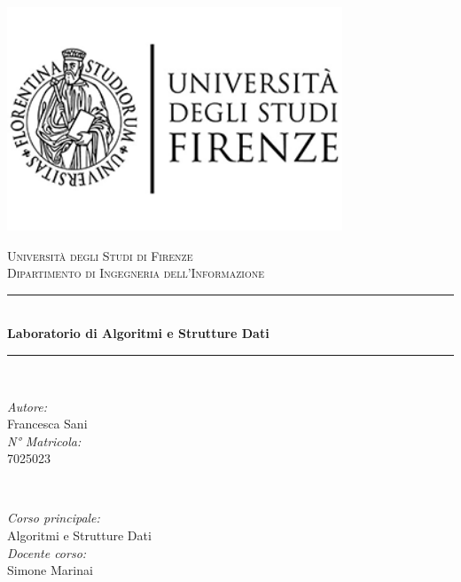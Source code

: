 \documentclass{article}
\begin{document}
\begin{titlepage}

\newcommand{\HRule}{\rule{\linewidth}{0.5mm}}

\center
\includegraphics[width=10cm]{unifi-logo.png}\\[1cm]

\center

\textsc{\LARGE Università degli Studi di Firenze}\\[0.5cm]
\textsc{\Large Dipartimento di Ingegneria dell'Informazione}\\[0.5cm] 

\makeatletter
\HRule \\[1cm]
{ \huge \bfseries Laboratorio di Algoritmi e Strutture Dati}\\[0.7cm]
\HRule \\[1.5cm]

\begin{minipage}{0.4\textwidth}
\begin{flushleft} \large
\emph{Autore:}\\
Francesca Sani %
\\[1.2em]
\emph{N° Matricola:}\\
7025023 \\[1.2em]
\end{flushleft}
\end{minipage}
~
\begin{minipage}{0.4\textwidth}
\begin{flushright} \large
\emph{Corso principale:} \\
Algoritmi e Strutture Dati  \\[1.2em]
\emph{Docente corso:} \\
Simone Marinai
\end{flushright}
\end{minipage}\\[2cm]
\makeatother


\vfill

\end{titlepage}
\end{document}
